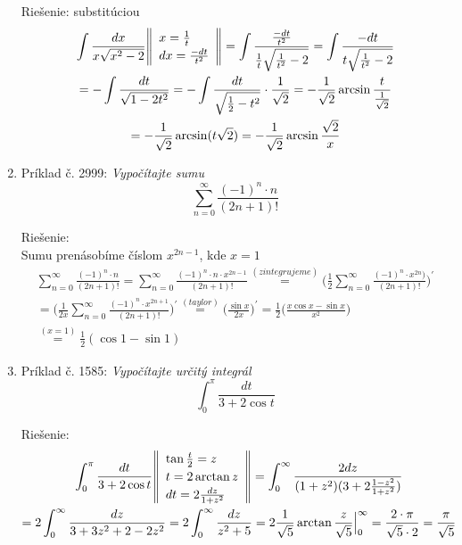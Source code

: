 \documentclass[12pt]{article}
\newenvironment{subst}
 {\renewcommand{\arraystretch}{1.2}%
       \left\|\begin{array}{l}}
            {\end{array}\right\|}
\begin{document}
\begin{enumerate}
        Riešenie: substitúciou
        \begin{gather*}
            \int\frac{dx}{x\sqrt{x^{2}-2}}
            \begin{subst}
                x=\frac{1}{t}\\
                dx=\frac{-dt}{t^{2}}
            \end{subst} =
            \int\frac{\frac{-dt}{t^{2}}}{\frac{1}{t}\sqrt{\frac{1}{t^{2}}-2}} =
            \int\frac{-dt}{t\sqrt{\frac{1}{t^{2}}-2}}\\
            = -\int\frac{dt}{\sqrt{1-2t^{2}}}
            = -\int\frac{dt}{\sqrt{\frac{1}{2}-t^{2}}}\cdot\frac{1}{\sqrt{2}}
            = -\frac{1}{\sqrt{2}}\arcsin \frac{t}{\frac{1}{\sqrt{2}}}\\
            = -\frac{1}{\sqrt{2}}\arcsin(t\sqrt{2})
            = -\frac{1}{\sqrt{2}}\arcsin\frac{\sqrt{2}}{x}
        \end{gather*}

    \item Príklad č. 2999: {\it Vypočítajte sumu}
        $$\sum_{n=0}^{\infty}\frac{(-1)^{n}\cdot n}{(2n+1)!}$$

        Riešenie:\\
        Sumu prenásobíme číslom $x^{2n-1}$, kde $x=1$
        \begin{gather*}
            \sum_{n=0}^{\infty}\frac{(-1)^{n}\cdot n}{(2n+1)!} =
            \sum_{n=0}^{\infty}\frac{(-1)^{n}\cdot n\cdot x^{2n-1}}{(2n+1)!}
            \stackrel{(zintegrujeme)}{=}
            \Bigg(\frac{1}{2}\sum_{n=0}^{\infty}\frac{(-1)^{n}\cdot x^{2n})}{(2n+1)!}\Bigg)^{\prime} \\
            = \Bigg(\frac{1}{2x}\sum_{n=0}^{\infty}\frac{(-1)^{n}\cdot x^{2n+1}}{(2n+1)!}\Bigg)^{\prime}
            \stackrel{(taylor)}{=}
            \Bigg(\frac{\sin x}{2x}\Bigg)^{\prime}
            = \frac{1}{2}\Bigg(\frac{x\cos x - \sin x}{x^{2}}\Bigg)\\
            \stackrel{(x=1)}{=}
            \frac{1}{2}(\cos 1 - \sin 1)
        \end{gather*}


    \item Príklad č. 1585: {\it Vypočítajte určitý integrál}
        $$\int_{0}^{\pi}\frac{dt}{3+2\cos t}$$

        Riešenie:
        \begin{gather*}
            \int_{0}^{\pi}\frac{dt}{3+2\cos t}
            \begin{subst}
                \tan \frac{t}{2} = z\\
                t = 2\arctan z\\
                dt = 2 \frac{dz}{1+z^{2}}
            \end{subst} =
            \int_{0}^{\infty}\frac{2dz}{(1+z^{2})(3+2\frac{1-z^{2}}{1+z^{2}})}\\
            = 2\int_{0}^{\infty}\frac{dz}{3+3z^{2}+2-2z^{2}}
            = 2\int_{0}^{\infty}\frac{dz}{z^{2}+5}
            = 2\frac{1}{\sqrt{5}}\arctan \frac{z}{\sqrt{5}}\Big|_{0}^{\infty}
            = \frac{2\cdot\pi}{\sqrt{5}\cdot2} = \frac{\pi}{\sqrt{5}}
        \end{gather*}

	\end{enumerate}
\end{document}
